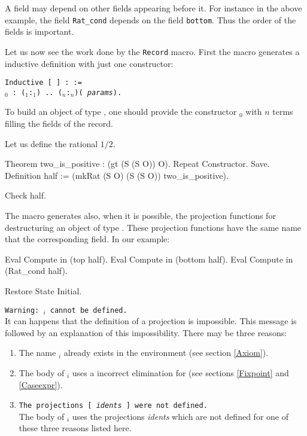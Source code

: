 A field may depend on other fields appearing before it. 
For instance in the above example, the field
\verb+Rat_cond+ depends on the field \verb+bottom+. Thus the order of
the fields is important.

Let us now see the work done by the {\tt Record} macro.
First the macro generates a inductive definition
with just one constructor:

\medskip
\noindent
{\tt Inductive {\ident} [ {\params} ] : {\sort} := \\
\mbox{}\hspace{0.4cm} {\ident$_0$} : ({\ident$_1$}:{\term$_1$}) .. 
({\ident$_n$}:{\term$_n$})({\ident} {\rm\sl params}).}
\medskip

To build an object of type {\ident}, one should provide the
constructor {\ident$_0$} with $n$ terms filling the fields of
the record.

Let us define the rational $1/2$.

\begin{coq_example*}
Theorem two_is_positive : (gt (S (S O)) O).
Repeat Constructor.
Save.
Definition half := (mkRat (S O) (S (S O)) two_is_positive).
\end{coq_example*}
\begin{coq_example}
Check half.
\end{coq_example}

The macro generates also, when it is possible, the projection
functions for destructuring an object of type {\ident}.
These projection functions have the same name that the corresponding
field. In our example:

\begin{coq_example}
Eval Compute in (top half).
Eval Compute in (bottom half).
Eval Compute in (Rat_cond half).
\end{coq_example}
\begin{coq_eval}
Restore State Initial.
\end{coq_eval}

\begin{Warnings}
\item {\tt Warning: {\ident$_i$} cannot be defined.}\\
  It can happens that the definition of a projection is impossible.
  This message is followed by an explanation of this impossibility.
  There may be three reasons:
   \begin{enumerate}
   \item The name {\ident$_i$} already exists in the environment (see
     section \ref{Axiom}).
   \item The body of {\ident$_i$} uses a incorrect elimination for
     {\ident} (see sections \ref{Fixpoint} and \ref{Caseexpr}).
   \item {\tt The projections [ {\rm\sl idents} ] were not defined.}\\ 
     The body of {\term$_i$} uses the projections {\rm\sl idents}
     which are not defined for one of these three reasons listed here.
   \end{enumerate}  
\end{Warnings}     

